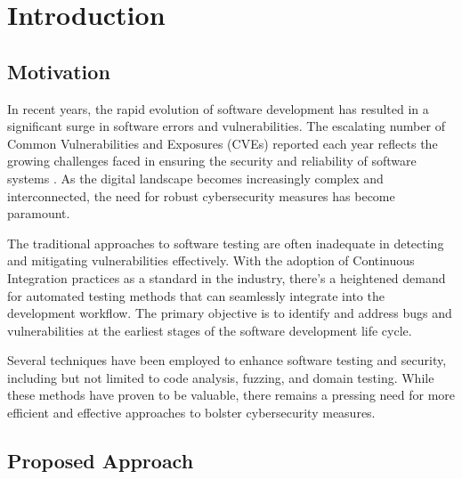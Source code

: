 \chapter{Introduction}
\label{chap:intro}

\section{Motivation}


In recent years, the rapid evolution of software development has resulted in a significant surge in software errors and vulnerabilities. The escalating number of Common Vulnerabilities and Exposures (CVEs) reported each year reflects the growing challenges faced in ensuring the security and reliability of software systems \cite{CVE}. As the digital landscape becomes increasingly complex and interconnected, the need for robust cybersecurity measures has become paramount.

The traditional approaches to software testing are often inadequate in detecting and mitigating vulnerabilities effectively. With the adoption of Continuous Integration practices as a standard in the industry, there's a heightened demand for automated testing methods that can seamlessly integrate into the development workflow. The primary objective is to identify and address bugs and vulnerabilities at the earliest stages of the software development life cycle.

Several techniques have been employed to enhance software testing and security, including but not limited to code analysis, fuzzing, and domain testing. While these methods have proven to be valuable, there remains a pressing need for more efficient and effective approaches to bolster cybersecurity measures.

\section{Proposed Approach}


